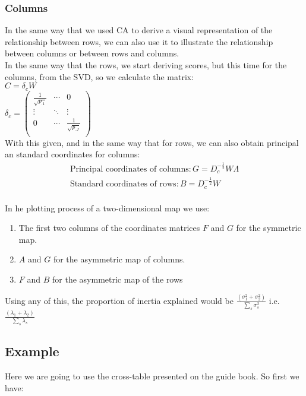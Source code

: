 \documentclass[12pt]{extarticle}
\numberwithin{equation}{section}
\newcommand{\Dsum}{\displaystyle\sum}
\begin{document}
\subsubsection{Columns}
In the same way that we used CA to derive a visual representation of the relationship between rows, we can also use it to illustrate the relationship between columns or between rows and columns.\\
In the same way that the rows, we start deriving scores, but this time for the columns, from the SVD, so we calculate the matrix:\\
$C=\delta_c W$ \\
$\delta_c = \begin{pmatrix}
\frac{1}{\sqrt{p_{ \cdot 1}}} & \cdots &0 \\
\vdots & \ddots & \vdots \\
 0 & \cdots & \frac{1}{\sqrt{p_{ \cdot J}}}\\
\end{pmatrix}$\\ 
With this given, and in the same way that for rows, we can also obtain principal an standard coordinates for columns: 
\begin{align*}
\text{Principal coordinates of columns}:  G = D_c^{-\frac{1}{2}} W\Lambda \\
\text{Standard coordinates of rows}:  B = D_c^{-\frac{1}{2}} W
\end{align*}
\\
In he plotting process of a two-dimensional map we use:
\begin{enumerate}
\item The first two columns of the coordinates matrices $F$ and $G$ for the symmetric map.
\item $A$ and $G$ for the asymmetric map of columns. 
\item $F$ and $B$ for the asymmetric map of the rows
\end{enumerate}
Using any of this, the proportion of inertia explained would be $\frac{(\sigma_1^2 + \sigma_2^2)}{\Dsum_s \sigma_s^2}$ i.e. $\frac{(\lambda_1 + \lambda_2)}{\Dsum_s \lambda_s}$ 
\subsection{Example}
Here we are going to use the cross-table presented on the guide book. 
So first we have: \\
\end{document}
